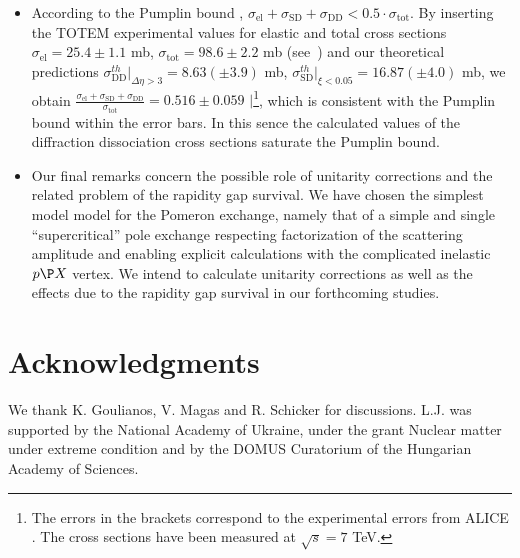 \documentclass[12pt]{article}
\begin{document}
\begin{itemize}
 \item According to the Pumplin bound \cite{Pumplin}, $\sigma_\mathrm{el}+\sigma_\mathrm{SD}+\sigma_\mathrm{DD}<0.5\cdot \sigma_\mathrm{tot}$.
 By inserting the TOTEM experimental values for elastic and total cross sections $\sigma_\mathrm{el}=25.4\pm1.1$ mb, $\sigma_\mathrm{tot}=98.6\pm2.2$ mb (see~\cite{[T1].TOTEM}) and our theoretical predictions $\sigma^{th}_\mathrm{DD}|_{\Delta\eta>3}=8.63(\pm3.9)$ mb, $\sigma^{th}_\mathrm{SD}|_{\xi<0.05}=16.87(\pm4.0)$ mb, we obtain $\frac{\sigma_\mathrm{el}+\sigma_\mathrm{SD}+\sigma_\mathrm{DD}}{\sigma_\mathrm{tot}}=0.516\pm0.059$ $|$\footnote{The errors in the brackets correspond to the experimental errors from ALICE \cite{Poghosyan for ALICE}. The cross sections have been measured at $\sqrt{s}=7$ TeV.}, which is consistent with the Pumplin bound within the error bars. In this sence the calculated values of the diffraction dissociation cross sections saturate the Pumplin bound.
 
 \item Our final remarks concern the possible role of unitarity corrections and the related problem of the rapidity gap survival. 
We have chosen the simplest model model for the Pomeron exchange, namely that of a simple and single ``supercritical'' pole exchange
\cite{JL, DL} respecting factorization of the scattering amplitude and enabling explicit calculations with the complicated inelastic
$p\P X$ vertex. We intend to calculate unitarity corrections as well as the effects due to the rapidity gap survival in our forthcoming studies.
\end{itemize}

\section*{Acknowledgments}
We thank K. Goulianos, V. Magas and R. Schicker for discussions. L.J. was supported by the National Academy of Ukraine, under the grant Nuclear matter under extreme condition and by 
the DOMUS Curatorium of the Hungarian Academy of Sciences.
\end{document}
